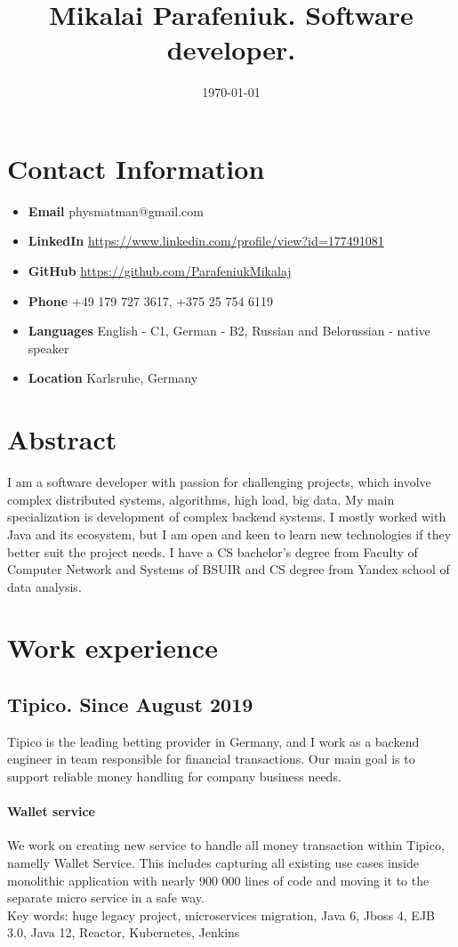 \documentclass{article}
\title{Mikalai Parafeniuk. Software developer.}
\date{\today}
\begin{document}
\maketitle

\section*{Contact Information}
\begin{itemize}
\item \textbf{Email} physmatman@gmail.com
\item \textbf{LinkedIn} \url{https://www.linkedin.com/profile/view?id=177491081}
\item \textbf{GitHub} \url{https://github.com/ParafeniukMikalaj}
\item \textbf{Phone} +49 179 727 3617, +375 25 754 6119 
\item \textbf{Languages} English - C1, German - B2, Russian and Belorussian - native speaker
\item \textbf{Location} Karlsruhe, Germany
\end{itemize}

\section*{Abstract}
I am a software developer with passion for challenging projects, which involve complex distributed systems, algorithms, high load, big data. My main specialization is development of complex backend systems. I mostly worked with Java and its ecosystem, but I am open and keen to learn new technologies if they better suit the project needs. I have a CS bachelor's degree from Faculty of Computer Network and Systems of BSUIR and CS degree from Yandex school of data analysis.

\section*{Work experience}

\subsection*{Tipico. Since August 2019}
Tipico is the leading betting provider in Germany, and I work as a backend engineer in team responsible for financial transactions. Our main goal is to support reliable money handling for company business needs.

\paragraph{Wallet service} We work on creating new service to handle all money transaction within Tipico, namelly Wallet Service. This includes capturing all existing use cases inside monolithic application with nearly 900 000 lines of code and moving it to the separate micro service in a safe way.\\
Key words: huge legacy project, microservices migration, Java 6, Jboss 4, EJB 3.0, Java 12, Reactor, Kubernetes, Jenkins
\end{document}
